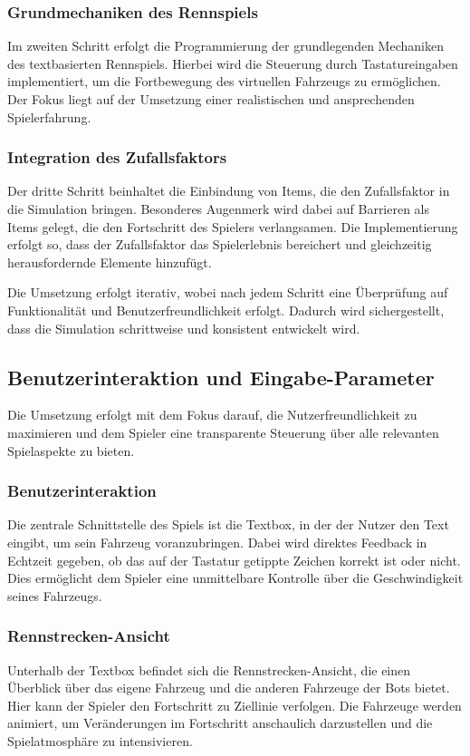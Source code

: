 \documentclass[hidelinks,12pt]{article}
\begin{document}
\subsubsection{Grundmechaniken des Rennspiels}
Im zweiten Schritt erfolgt die Programmierung der grundlegenden Mechaniken des textbasierten Rennspiels. Hierbei wird die Steuerung durch Tastatureingaben implementiert, um die Fortbewegung des virtuellen Fahrzeugs zu ermöglichen. Der Fokus liegt auf der Umsetzung einer realistischen und ansprechenden Spielerfahrung.

\subsubsection{Integration des Zufallsfaktors}
Der dritte Schritt beinhaltet die Einbindung von Items, die den Zufallsfaktor in die Simulation bringen. Besonderes Augenmerk wird dabei auf Barrieren als Items gelegt, die den Fortschritt des Spielers verlangsamen. Die Implementierung erfolgt so, dass der Zufallsfaktor das Spielerlebnis bereichert und gleichzeitig herausfordernde Elemente hinzufügt.

Die Umsetzung erfolgt iterativ, wobei nach jedem Schritt eine Überprüfung auf Funktionalität und Benutzerfreundlichkeit erfolgt. Dadurch wird sichergestellt, dass die Simulation schrittweise und konsistent entwickelt wird.

\subsection{Benutzerinteraktion und Eingabe-Parameter}
Die Umsetzung erfolgt mit dem Fokus darauf, die Nutzerfreundlichkeit zu maximieren und dem Spieler eine transparente Steuerung über alle relevanten Spielaspekte zu bieten.

\subsubsection{Benutzerinteraktion}
Die zentrale Schnittstelle des Spiels ist die Textbox, in der der Nutzer den Text eingibt, um sein Fahrzeug voranzubringen. Dabei wird direktes Feedback in Echtzeit gegeben, ob das auf der Tastatur getippte Zeichen korrekt ist oder nicht. Dies ermöglicht dem Spieler eine unmittelbare Kontrolle über die Geschwindigkeit seines Fahrzeugs.

\subsubsection{Rennstrecken-Ansicht}
Unterhalb der Textbox befindet sich die Rennstrecken-Ansicht, die einen Überblick über das eigene Fahrzeug und die anderen Fahrzeuge der Bots bietet. Hier kann der Spieler den Fortschritt zu Ziellinie verfolgen. Die Fahrzeuge werden animiert, um Veränderungen im Fortschritt anschaulich darzustellen und die Spielatmosphäre zu intensivieren.
\end{document}
